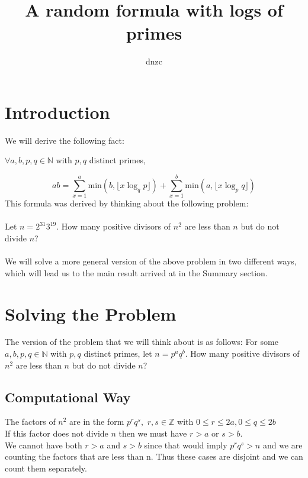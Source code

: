 \documentclass{article}
\begin{document}
\title{A random formula with logs of primes}
\author{dnzc}
\date{}

\maketitle

\tableofcontents
\newpage



\section{Introduction}

We will derive the following fact:

$\forall a,b,p,q \in \mathbb{N}$ with $p,q$ distinct primes,

\[ab = \sum_{x=1}^a \text{min}(b, \lfloor x \log_q p\rfloor) + \sum_{x=1}^b \text{min}(a, \lfloor x \log_p q\rfloor)\]
This formula was derived by thinking about the following problem:\\\\
Let $n=2^{31}3^{19}$. How many positive divisors of $n^2$ are less than $n$ but do not divide $n$?\\\\
We will solve a more general version of the above problem in two different ways, which will lead us to the main result arrived at in the Summary section.


\section{Solving the Problem}
The version of the problem that we will think about is as follows:
For some $a,b,p,q \in \mathbb{N}$ with $p,q$ distinct primes, let $n = p^{a}q^{b}$. How many positive divisors of $n^2$ are less than $n$ but do not divide $n$?


\subsection{Computational Way}

The factors of $n^2$ are in the form $p^r q^s, \,\,r,s \in \mathbb{Z}$ with $0 \leq r \leq 2a, 0 \leq q \leq 2b$\\
If this factor does not divide $n$ then we must have $r>a$ or $s>b$.\\
We cannot have both $r>a$ and $s>b$ since that would imply $p^r q^s > n$ and we are counting the factors that are less than n.
Thus these cases are disjoint and we can count them separately.
\end{document}
